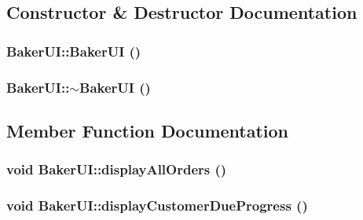 \subsection{Constructor \& Destructor Documentation}
\hypertarget{class_baker_u_i_87258ad33e2a7d3de72a762f438be622}{
\subsubsection[BakerUI]{\setlength{\rightskip}{0pt plus 5cm}Baker\-UI::Baker\-UI ()}}
\label{class_baker_u_i_87258ad33e2a7d3de72a762f438be622}


\hypertarget{class_baker_u_i_915b879a3aa8be3782d3a24fd36fb81d}{
\subsubsection[$\sim$BakerUI]{\setlength{\rightskip}{0pt plus 5cm}Baker\-UI::$\sim$Baker\-UI ()}}
\label{class_baker_u_i_915b879a3aa8be3782d3a24fd36fb81d}




\subsection{Member Function Documentation}
\hypertarget{class_baker_u_i_d69822b9289cd53fa4da8f4f39864d19}{
\subsubsection[displayAllOrders]{\setlength{\rightskip}{0pt plus 5cm}void Baker\-UI::display\-All\-Orders ()}}
\label{class_baker_u_i_d69822b9289cd53fa4da8f4f39864d19}


\hypertarget{class_baker_u_i_00eeac47a993278134a2d8ba936f6f31}{
\subsubsection[displayCustomerDueProgress]{\setlength{\rightskip}{0pt plus 5cm}void Baker\-UI::display\-Customer\-Due\-Progress ()}}
\label{class_baker_u_i_00eeac47a993278134a2d8ba936f6f31}


